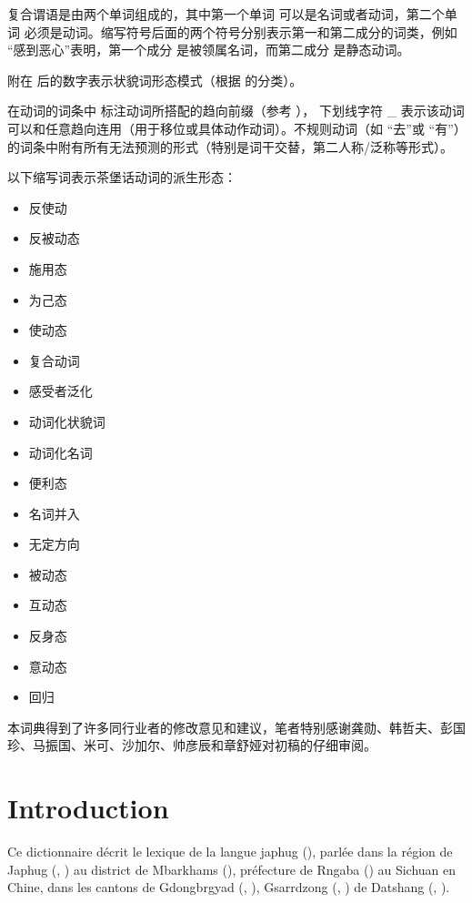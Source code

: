 复合谓语是由两个单词组成的，其中第一个单词  可以是名词或者动词，第二个单词 必须是动词。缩写符号后面的两个符号分别表示第一和第二成分的词类，例如   “感到恶心”表明，第一个成分  是被领属名词，而第二成分 是静态动词。

附在  后的数字表示状貌词形态模式（根据 \citealt{japhug14ideophones}的分类）。

在动词的词条中  标注动词所搭配的趋向前缀（参考 \citealt[267-9]{jacques14linking}）， 下划线字符 \_ 表示该动词可以和任意趋向连用（用于移位或具体动作动词）。不规则动词（如  “去”或    “有”）的词条中附有所有无法预测的形式（特别是词干交替，第二人称/泛称等形式）。

 以下缩写词表示茶堡话动词的派生形态：

\begin{itemize}
\item {} 反使动 
\item {} 反被动态
\item {} 施用态
\item {} 为己态
\item {} 使动态
\item {} 复合动词
\item {} 感受者泛化
\item {} 动词化状貌词
\item {} 动词化名词
\item {} 便利态
\item {} 名词并入
\item {} 无定方向
\item {} 被动态
\item {} 互动态
\item {} 反身态
\item {} 意动态
\item {} 回归
\end{itemize}

本词典得到了许多同行业者的修改意见和建议，笔者特别感谢龚勋、韩哲夫、彭国珍、马振国、米可、沙加尔、帅彦辰和章舒娅对初稿的仔细审阅。
\newpage
\normalfont
\section*{Introduction}

Ce  dictionnaire décrit le lexique de la langue japhug (), parlée dans la région de Japhug (, ) au district de Mbarkhams (), préfecture de Rngaba () au Sichuan en Chine, dans les cantons de Gdongbrgyad (, ), Gsarrdzong (,   ) de Datshang (, ).  

